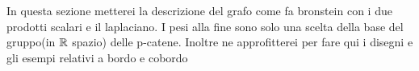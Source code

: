 \documentclass[../1.tex]{subfiles}
\begin{document}
    {\color{red} In questa sezione metterei la descrizione del grafo come fa bronstein con i due prodotti scalari e il laplaciano.
    I pesi alla fine sono solo una scelta della base del gruppo(in $\mathbb{R}$ spazio) delle p-catene. Inoltre ne approfitterei per fare qui i disegni 
    e gli esempi relativi a bordo e cobordo}
\end{document}
